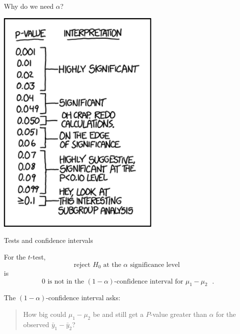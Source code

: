 \begin{frame}{Why do we need $\alpha$?}

    \begin{center}
        \includegraphics[width=0.6\textwidth]{p_values}
    \end{center}

\end{frame}


\begin{frame}{Tests and confidence intervals}

  For the $t$-test,
  \[  \text{reject $H_0$ at the $\alpha$ significance level} \]
  is 
  \[  \text{ 0 is not in the $(1-\alpha)$-confidence interval for $\mu_1-\mu_2$ }. \]


  \vspace{2em}


  The $(1-\alpha)$-confidence interval asks: 
  \begin{quote}
    How big could $\mu_1-\mu_2$ be and still get a $P$-value greater than $\alpha$ for the observed $\bar y_1 - \bar y_2$?
  \end{quote}


\end{frame}


